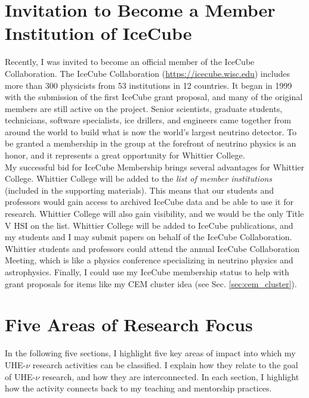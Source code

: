 \documentclass[../../../main.tex]{subfiles}
\begin{document}
\section{Invitation to Become a Member Institution of IceCube}
\label{sec:invite}

Recently, I was invited to become an official member of the IceCube Collaboration.  The IceCube Collaboration (\url{https://icecube.wisc.edu}) includes more than 300 physicists from 53 institutions in 12 countries. It began in 1999 with the submission of the first IceCube grant proposal, and many of the original members are still active on the project.  Senior scientists, graduate students, technicians, software specialists, ice drillers, and engineers came together from around the world to build what is now the world’s largest neutrino detector.  To be granted a membership in the group at the forefront of neutrino physics is an honor, and it represents a great opportunity for Whittier College.
\\
\vspace{0.25cm}
My successful bid for IceCube Membership brings several advantages for Whittier College.  Whittier College will be added to the \textit{list of member institutions} (included in the supporting materials).  This means that our students and professors would gain access to archived IceCube data and be able to use it for research.  Whittier College will also gain visibility, and we would be the only Title V HSI on the list.  Whittier College will be added to IceCube publications, and my students and I may submit papers on behalf of the IceCube Collaboration.  Whittier students and professors could attend the annual IceCube Collaboration Meeting, which is like a physics conference specializing in neutrino physics and astrophysics.  Finally, I could use my IceCube membership status to help with grant proposals for items like my CEM cluster idea (see Sec. \ref{sec:cem_cluster}).

\section{Five Areas of Research Focus}
\label{sec:neutrino}

In the following five sections, I highlight five key areas of impact into which my UHE-$\nu$ research activities can be classified.  I explain how they relate to the goal of UHE-$\nu$ research, and how they are interconnected.  In each section, I highlight how the activity connects back to my teaching and mentorship practices.
\end{document}

